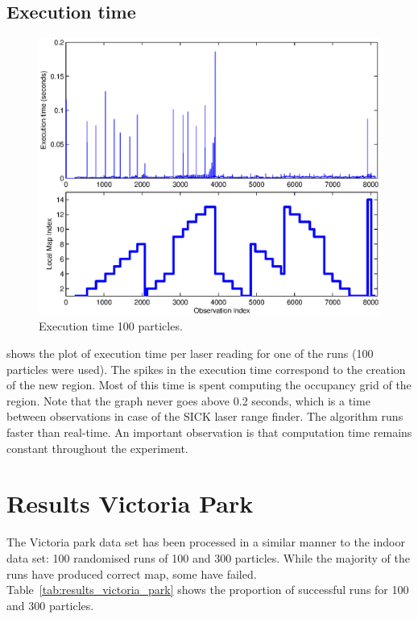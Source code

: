 \subsection{Execution time}


\begin{figure}[htbp]
  \centering
  \includegraphics[width=15cm]{Pics/corners_execution_time}
  
  \caption{Execution time 100 particles.}
  \label{fig:corners_execution_time}
\end{figure}

 shows the plot of execution
time per laser reading for one of the runs (100 particles were used).
The spikes in the execution time correspond to the creation of the new
region. Most of this time is spent computing the occupancy grid of the
region. Note that the graph never goes above 0.2 seconds, which is a
time between observations in case of the SICK laser range finder. The
algorithm runs faster than real-time. An important observation is that
computation time remains constant throughout the experiment.

\section {Results Victoria Park}

The Victoria park data set has been processed in a similar manner to
the indoor data set: 100 randomised runs of 100 and 300
particles. While the majority of the runs have produced correct map,
some have failed. Table~\ref{tab:results_victoria_park} shows the
proportion of successful runs for 100 and 300 particles.


